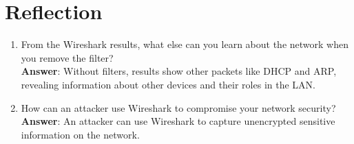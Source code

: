 \documentclass[12pt]{article}
\begin{document}
\section{Reflection}

\begin{enumerate}
    \item From the Wireshark results, what else can you learn about the network when you remove the filter? \\
    \textbf{Answer}: Without filters, results show other packets like DHCP and ARP, revealing information about other devices and their roles in the LAN. \\
    \item How can an attacker use Wireshark to compromise your network security?  \\
    \textbf{Answer}: An attacker can use Wireshark to capture unencrypted sensitive information on the network.    
\end{enumerate}
\end{document}

